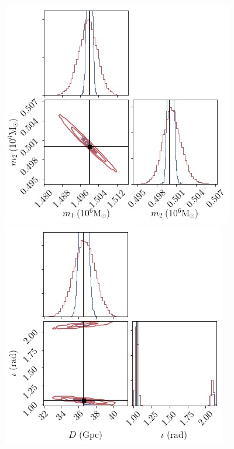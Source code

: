 \documentclass[aps,showpacs,twocolumn,prd,superscriptaddress,nofootinbib]{revtex4-1}
\begin{document}
\begin{figure}
\begin{minipage}{.32\linewidth}
   \end{minipage}
   \begin{minipage}{.32\linewidth}
      \includegraphics[width=.99\linewidth]{corner_smbh_case9_hm_tseries_m1m2_zoom.png}
   \end{minipage}
   \begin{minipage}{.32\linewidth}
      \includegraphics[width=.99\linewidth]{corner_smbh_case9_hm_tseries_Dinc_zoom.png}

\end{minipage}
\end{figure}
\end{document}
